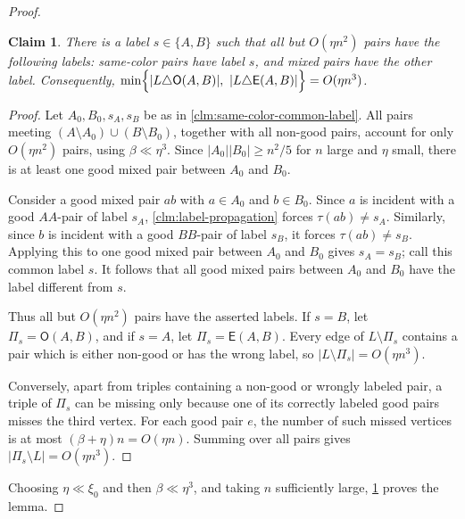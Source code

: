 \documentclass[10pt,a4paper]{amsart}
\newtheorem{claim}{Claim}
\begin{document}
\begin{proof}
\begin{claim}\label{clm:mixed-labels-and-template}
There is a label $s\in\{A,B\}$ such that all but $O(\eta n^2)$ pairs have the following labels: same-color pairs have label $s$, and mixed pairs have the other label.  Consequently, $\min\Bigl\{|L\triangle \mathsf O(A,B)|,\ |L\triangle \mathsf E(A,B)|\Bigr\}=O(\eta n^3)$. 
\end{claim}

\begin{proof}
Let $A_0,B_0,s_A,s_B$ be as in \cref{clm:same-color-common-label}.  All pairs meeting $(A\setminus A_0)\cup(B\setminus B_0)$, together with all non-good pairs, account for only $O(\eta n^2)$ pairs, using $\beta\ll\eta^3$.  Since $|A_0||B_0|\ge n^2/5$ for $n$ large and $\eta$ small, there is at least one good mixed pair between $A_0$ and $B_0$.

Consider a good mixed pair $ab$ with $a\in A_0$ and $b\in B_0$.  Since $a$ is incident with a good $AA$-pair of label $s_A$, \cref{clm:label-propagation} forces $\tau(ab)\ne s_A$.  Similarly, since $b$ is incident with a good $BB$-pair of label $s_B$, it forces $\tau(ab)\ne s_B$.  Applying this to one good mixed pair between $A_0$ and $B_0$ gives $s_A=s_B$; call this common label $s$.  It follows that all good mixed pairs between $A_0$ and $B_0$ have the label different from $s$.

Thus all but $O(\eta n^2)$ pairs have the asserted labels.  If $s=B$, let $\Pi_s=\mathsf O(A,B)$, and if $s=A$, let $\Pi_s=\mathsf E(A,B)$.  Every edge of $L\setminus\Pi_s$ contains a pair which is either non-good or has the wrong label, so $|L\setminus\Pi_s|=O(\eta n^3)$.

Conversely, apart from triples containing a non-good or wrongly labeled pair, a triple of $\Pi_s$ can be missing only because one of its correctly labeled good pairs misses the third vertex.  For each good pair $e$, the number of such missed vertices is at most $(\beta+\eta)n=O(\eta n)$.  Summing over all pairs gives $|\Pi_s\setminus L|=O(\eta n^3)$.
\end{proof}

Choosing $\eta\ll\xi_0$ and then $\beta\ll\eta^3$, and taking $n$ sufficiently large, \cref{clm:mixed-labels-and-template} proves the lemma.
\end{proof}
\end{document}
